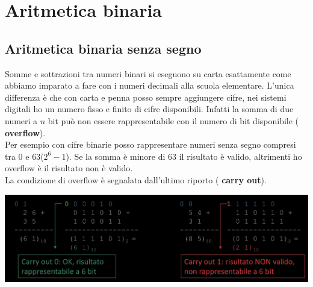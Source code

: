 \documentclass{article}
\begin{document}
\section{Aritmetica binaria}


\subsection{Aritmetica binaria senza segno}
Somme e sottrazioni tra numeri binari si eseguono su carta esattamente come abbiamo imparato a fare con i numeri decimali alla scuola elementare. L'unica differenza è che con carta e penna posso sempre aggiungere cifre, nei sistemi digitali ho un numero fisso e finito di cifre disponibili. Infatti la somma di due numeri a $n$ bit può non essere rappresentabile con il numero di bit disponibile (\textbf{\color{cyan} overflow}).
\vspace{0.1cm}\\
Per esempio con cifre binarie posso rappresentare numeri senza segno compresi tra 0 e 63($2^6-1$). Se la somma è minore di 63 il risultato è valido, altrimenti ho overflow è il risultato non è valido.\\
La condizione di overflow è segnalata dall’ultimo riporto (\textbf{\color{cyan} carry out}).
\begin{center}
    \includegraphics[scale=0.35]{aritmetica 1.png}
\end{center}
\end{document}
